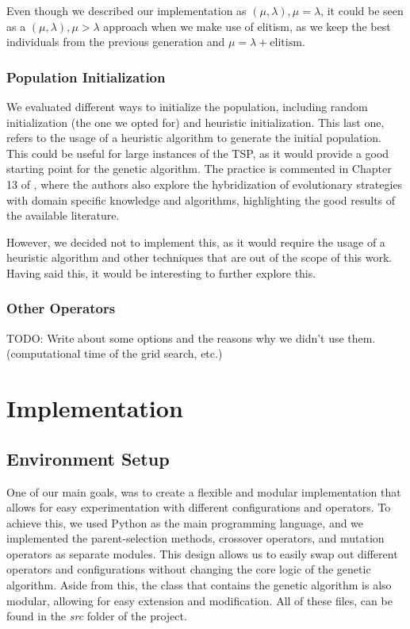 \documentclass[12pt]{article}
\begin{document}
Even though we described our implementation as $(\mu,\lambda), \mu=\lambda$, it could be seen as a $(\mu,\lambda), \mu>\lambda$ approach when we make use of elitism, as we keep the best individuals from the previous generation and $\mu=\lambda+\text{elitism}$.


\subsubsection{Population Initialization}
We evaluated different ways to initialize the population, including random initialization (the one we opted for) and heuristic initialization. This last one, refers to the usage of a heuristic algorithm to generate the initial population. This could be useful for large instances of the TSP, as it would provide a good starting point for the genetic algorithm. The practice is commented in Chapter 13 of \cite{Back2000}, where the authors also explore the hybridization of evolutionary strategies with domain specific knowledge and algorithms, highlighting the good results of the available literature.

However, we decided not to implement this, as it would require the usage of a heuristic algorithm and other techniques that are out of the scope of this work. Having said this, it would be interesting to further explore this.

\subsubsection{Other Operators}
TODO: Write about some options and the reasons why we didn't use them. (computational time of the grid search, etc.)

\section{Implementation}
\subsection{Environment Setup}
One of our main goals, was to create a flexible and modular implementation that allows for easy experimentation with different configurations and operators. To achieve this, we used Python as the main programming language, and we implemented the parent-selection methods, crossover operators, and mutation operators as separate modules. This design allows us to easily swap out different operators and configurations without changing the core logic of the genetic algorithm. Aside from this, the class that contains the genetic algorithm is also modular, allowing for easy extension and modification. All of these files, can be found in the \textit{src} folder of the project.
\end{document}
